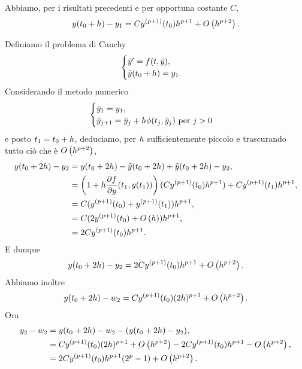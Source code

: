 \Proof Abbiamo, per i risultati precedenti e per opportuna costante $C$,
\[
	y(t_0 + h) - y_1 = Cy^{(p + 1)}(t_0) h^{p + 1} + O \left ( h^{p + 2} \right ).
\]
\par Definiamo il problema di Cauchy
\[
\begin{cases}
	\tilde{y}' = f(t,\tilde{y}),\\
	\tilde{y}(t_0 + h) = y_1.
\end{cases}
\]
Considerando il metodo numerico
\[
\begin{cases}
	\tilde{y}_1 = y_1,\\
	\tilde{y}_{j + 1} = \tilde{y}_j + h\phi(t_j,\tilde{y}_j)\text{ per }j > 0
\end{cases}
\]
e posto $t_1 = t_0 + h$, deduciamo, per $h$ sufficientemente piccolo e trascurando tutto ci\`o che \`e $O \left ( h^{p + 2} \right )$,
\begin{align*}
	y(t_0 + 2h) - y_2
	&= y(t_0 + 2h) - \tilde{y}(t_0 + 2h) + \tilde{y}(t_0 + 2h) - y_2,\\
	&= \left ( 1 + h \frac{\partial f}{\partial y}(t_1,y(t_1)) \right ) (Cy^{(p + 1)}(t_0) h^{p + 1}) + C y^{(p + 1)}(t_1) h^{p + 1},\\
	&= C (y^{(p + 1)}(t_0) + y^{(p + 1)}(t_1))h^{p + 1},\\
	&= C (2 y^{(p + 1)}(t_0) + O \left ( h \right )) h^{p + 1},\\
	&= 2 C y^{(p + 1)}(t_0) h^{p + 1}.
\end{align*}
E dunque
\[
	y(t_0 + 2h) - y_2 = 2 C y^{(p + 1)}(t_0) h^{p + 1} + O \left ( h^{p + 2} \right ).
\]
Abbiamo inoltre
\[
	y(t_0 + 2h) - w_2 = Cy^{(p + 1)}(t_0) (2h)^{p + 1} + O \left ( h^{p + 2} \right ).
\]
Ora
\begin{align*}
	y_2 - w_2
	&= y(t_0 + 2h) - w_2 - (y(t_0 + 2h) - y_2),\\
	&= Cy^{(p + 1)}(t_0) (2h)^{p + 1} + O \left ( h^{p + 2} \right ) - 2 C y^{(p + 1)}(t_0) h^{p + 1} - O \left ( h^{p + 2} \right ),\\
	&= 2Cy^{(p + 1)}(t_0)h^{p + 1}(2^p - 1) + O \left ( h^{p + 2} \right ).
\end{align*}
